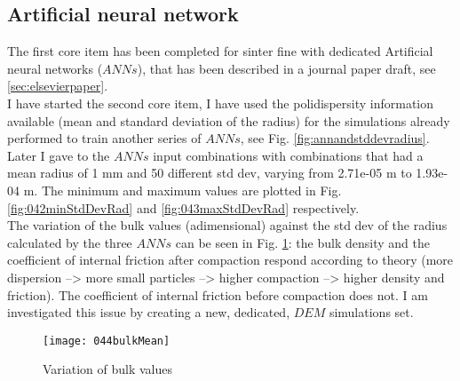 \subsection{Artificial neural network}
\label{subsection:artificialneuralnetwork}

The first core item has been completed for sinter fine with dedicated Artificial
neural networks ($ANNs$), that has been described in a journal paper draft, see
\ref{sec:elsevierpaper}.\\

I have started the second core item, I have used the polidispersity information
available (mean and standard deviation of the radius) for the simulations
already performed to train another series of $ANNs$, see Fig.
\ref{fig:annandstddevradius}.\\
Later I gave to the $ANNs$ input combinations with combinations that had a mean radius of 1 mm
and 50 different std dev, varying from 2.71e-05 m to 1.93e-04 m.
The minimum and maximum values are plotted in Fig. \ref{fig:042minStdDevRad} and
\ref{fig:043maxStdDevRad} respectively.\\
The variation of the bulk values (adimensional) against the std dev of the
radius calculated by the three $ANNs$ can be seen in Fig. \ref{fig:044bulkMean}:
the bulk density and the coefficient of internal friction after
compaction respond according to theory (more dispersion --> more small particles
--> higher compaction --> higher density and friction).
The coefficient of internal friction before compaction does not.
I am investigated this issue by creating a new, dedicated, $DEM$ simulations
set.


\begin{figure}[!h]
\centering
\texttt{[image: 044bulkMean]}
\caption{Variation of bulk values }
\label{fig:044bulkMean}
\end{figure}

\newpage
